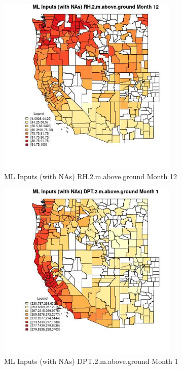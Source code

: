\begin{figure} 
\centering  
\includegraphics[width=0.77\textwidth]{Code_Outputs/Report_ML_input_PM25_Step4_part_f_de_duplicated_aves_prioritize_24hr_obswNAs_CountyRH2mabovegroundmedianMonth12.jpg} 
\caption{\label{fig:Report_ML_input_PM25_Step4_part_f_de_duplicated_aves_prioritize_24hr_obswNAsCountyRH2mabovegroundmedianMonth12}ML Inputs (with NAs) RH.2.m.above.ground Month 12} 
\end{figure} 
 

\clearpage 

\begin{figure} 
\centering  
\includegraphics[width=0.77\textwidth]{Code_Outputs/Report_ML_input_PM25_Step4_part_f_de_duplicated_aves_prioritize_24hr_obswNAs_CountyDPT2mabovegroundmedianMonth1.jpg} 
\caption{\label{fig:Report_ML_input_PM25_Step4_part_f_de_duplicated_aves_prioritize_24hr_obswNAsCountyDPT2mabovegroundmedianMonth1}ML Inputs (with NAs) DPT.2.m.above.ground Month 1} 
\end{figure} 
 

